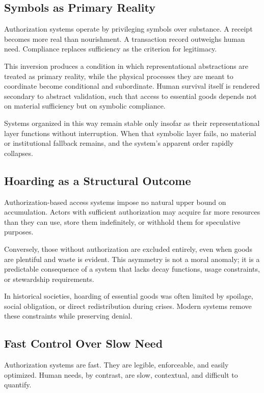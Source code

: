 \documentclass[12pt]{article} \usepackage[margin=1in]{geometry} \usepackage{setspace} \usepackage{amsmath,amssymb} \usepackage{hyperref}
\begin{document}
\subsection{Symbols as Primary Reality}

Authorization systems operate by privileging symbols over substance. A receipt becomes more real than nourishment. A transaction record outweighs human need. Compliance replaces sufficiency as the criterion for legitimacy.

This inversion produces a condition in which representational abstractions are treated as primary reality, while the physical processes they are meant to coordinate become conditional and subordinate. Human survival itself is rendered secondary to abstract validation, such that access to essential goods depends not on material sufficiency but on symbolic compliance.

Systems organized in this way remain stable only insofar as their representational layer functions without interruption. When that symbolic layer fails, no material or institutional fallback remains, and the system’s apparent order rapidly collapses.

\subsection{Hoarding as a Structural Outcome}

Authorization-based access systems impose no natural upper bound on accumulation. Actors with sufficient authorization may acquire far more resources than they can use, store them indefinitely, or withhold them for speculative purposes.

Conversely, those without authorization are excluded entirely, even when goods are plentiful and waste is evident. This asymmetry is not a moral anomaly; it is a predictable consequence of a system that lacks decay functions, usage constraints, or stewardship requirements.

In historical societies, hoarding of essential goods was often limited by spoilage, social obligation, or direct redistribution during crises. Modern systems remove these constraints while preserving denial.

\subsection{Fast Control Over Slow Need}

Authorization systems are fast. They are legible, enforceable, and easily optimized. Human needs, by contrast, are slow, contextual, and difficult to quantify.
\end{document}
